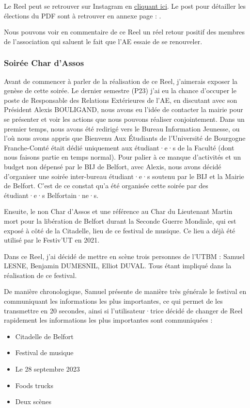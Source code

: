 Le Reel peut se retrouver sur Instagram en \href{https://www.instagram.com/reel/CxQtgEXMqon/?utm_source=ig_web_copy_link&igshid=MzRlODBiNWFlZA==}{cliquant ici}.
Le post pour détailler les élections du \gls{PDF} sont à retrouver en annexe page : \pageref{subsec:interface-instagram}.

Nous pouvons voir en commentaire de ce Reel un réel retour positif des membres de l'association qui saluent le fait que l'\gls{AE} essaie de se renouveler.

\subsubsection{Soirée Char d'Assos}

Avant de commencer à parler de la réalisation de ce Reel, j'aimerais exposer la genèse de cette soirée.
Le dernier semestre (P23) j'ai eu la chance d'occuper le poste de Responsable des Relations Extérieures de l'\gls{AE}, en discutant avec son Président Alexis BOULIGAND, nous avons eu l'idée de contacter la mairie pour se présenter et voir les actions que nous pouvons réaliser conjointement.
Dans un premier temps, nous avons été redirigé vers le Bureau Information Jeunesse, ou l'où nous avons appris que Bienvenu Aux Étudiants de l'Université de Bourgogne Franche-Comté était dédié uniquement aux étudiant·e·s de la Faculté (dont nous faisons partie en temps normal).
Pour palier à ce manque d'activités et un budget non dépensé par le BIJ de Belfort, avec Alexis, nous avons décidé d'organiser une soirée inter-bureau étudiant·e·s soutenu par le BIJ et la Mairie de Belfort.
C'est de ce constat qu'a été organisée cette soirée par des étudiant·e·s Belfortain·ne·s.

Ensuite, le non Char d'Assos et une référence au Char du Lieutenant Martin mort pour la libération de Belfort durant la Seconde Guerre Mondiale, qui est exposé à côté de la Citadelle, lieu de ce festival de musique.
Ce lieu a déjà été utilisé par le Festiv'UT en 2021.

Dans ce Reel, j'ai décidé de mettre en scène trois personnes de l'\gls{UTBM} : Samuel LESNE, Benjamin DUMESNIL, Elliot DUVAL.
Tous étant impliqué dans la réalisation de ce festival.

De manière chronologique, Samuel présente de manière très générale le festival en communiquant les informations les plus importantes, ce qui permet de les transmettre en 20 secondes, ainsi si l'utilisateur·trice décidé de changer de Reel rapidement les informations les plus importantes sont communiquées :
\begin{itemize}
    \item Citadelle de Belfort
    \item Festival de musique
    \item Le 28 septembre 2023
    \item Foods trucks
    \item Deux scènes
\end{itemize}

